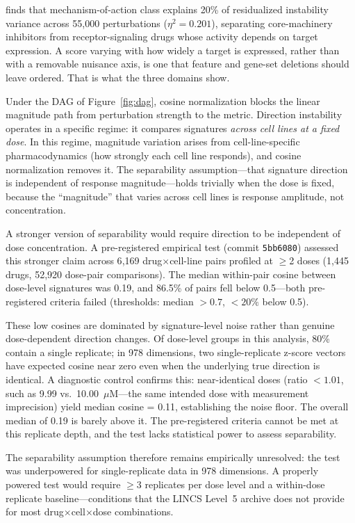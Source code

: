 \documentclass[11pt]{article}
\begin{document}
\citet{tower2026atlas} finds that mechanism-of-action class explains 20\% of
residualized instability variance across 55{,}000 perturbations
($\eta^2 = 0.201$), separating core-machinery inhibitors from
receptor-signaling drugs whose activity depends on target expression. A score
varying with how widely a target is expressed, rather than with a removable
nuisance axis, is one that feature and gene-set deletions should leave ordered.
That is what the three domains show.

Under the DAG of Figure~\ref{fig:dag}, cosine normalization blocks the
linear magnitude path from perturbation strength to the metric. Direction
instability operates in a specific regime: it compares signatures
\emph{across cell lines at a fixed dose}. In this regime, magnitude
variation arises from cell-line-specific pharmacodynamics (how strongly
each cell line responds), and cosine normalization removes it. The
separability assumption---that signature direction is independent of
response magnitude---holds trivially when the dose is fixed, because
the ``magnitude'' that varies across cell lines is response amplitude,
not concentration.

A stronger version of separability would require direction to be
independent of dose concentration. A pre-registered empirical test
(commit \texttt{5bb6080}) assessed this stronger claim across 6{,}169
drug$\times$cell-line pairs profiled at $\geq$2 doses (1{,}445 drugs,
52{,}920 dose-pair comparisons). The median within-pair cosine between
dose-level signatures was 0.19, and 86.5\% of pairs fell below
0.5---both pre-registered criteria failed (thresholds: median $> 0.7$,
$< 20\%$ below 0.5).

These low cosines are dominated by signature-level noise rather than
genuine dose-dependent direction changes. Of dose-level groups in this
analysis, 80\% contain a single replicate; in 978 dimensions, two
single-replicate z-score vectors have expected cosine near zero even
when the underlying true direction is identical. A diagnostic control
confirms this: near-identical doses (ratio $< 1.01$, such as 9.99 vs.\
10.00~$\mu$M---the same intended dose with measurement imprecision)
yield median cosine = 0.11, establishing the noise floor. The overall
median of 0.19 is barely above it. The pre-registered criteria cannot
be met at this replicate depth, and the test lacks statistical power
to assess separability.

The separability assumption therefore remains empirically unresolved:
the test was underpowered for single-replicate data in 978 dimensions.
A properly powered test would require $\geq$3 replicates per dose
level and a within-dose replicate baseline---conditions that the LINCS
Level~5 archive does not provide for most drug$\times$cell$\times$dose
combinations.
\end{document}
